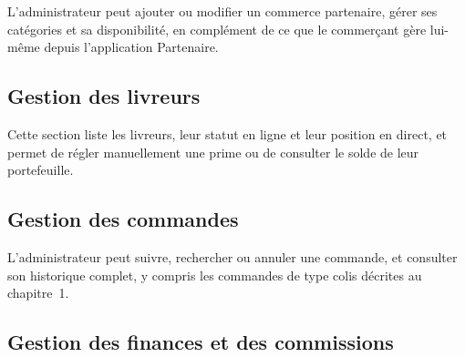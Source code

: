 \documentclass[12pt,fleqn,a4paper]{report}
\begin{document}
\begin{justify}
L'administrateur peut ajouter ou modifier un commerce partenaire, gérer ses catégories et sa disponibilité, en complément de ce que le commerçant gère lui-même depuis l'application Partenaire.

\subsection{Gestion des livreurs}


Cette section liste les livreurs, leur statut en ligne et leur position en direct, et permet de régler manuellement une prime ou de consulter le solde de leur portefeuille.

\subsection{Gestion des commandes}


L'administrateur peut suivre, rechercher ou annuler une commande, et consulter son historique complet, y compris les commandes de type colis décrites au chapitre~1.

\subsection{Gestion des finances et des commissions}



\end{justify}
\end{document}
